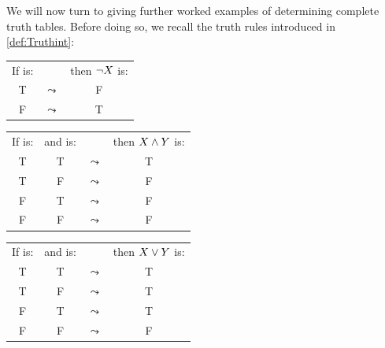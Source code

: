 We will now turn to giving further worked examples of determining complete truth tables. Before doing so, we recall the truth rules introduced in \cref{def:Truthint}:
\begin{highlighted}
		\begin{center}
			\begin{tabular}{ccc}
				If \metaX is:&&then $\neg X$ is:\\
				T &$\leadsto$& F\\
				F &$\leadsto$& T
			\end{tabular}
		\end{center}
		\begin{center}
			\begin{tabular}{cccc}
				If \metaX is:&and \metaY is:&&then $X\mathbin{\wedge}Y$ is:\\
				T & T &$\leadsto$& T\\
				T & F &$\leadsto$& F\\
				F & T &$\leadsto$& F\\
				F & F &$\leadsto$& F
			\end{tabular}
		\end{center}
		\begin{center}
			\begin{tabular}{cccc}
				If \metaX is:&and \metaY is:&&then $X\vee Y$ is:\\
				T & T &$\leadsto$& T\\
				T & F &$\leadsto$& T\\
				F & T &$\leadsto$& T\\
				F & F &$\leadsto$& F
			\end{tabular}
		\end{center}
		\begin{center}

\end{center}
\end{highlighted}
